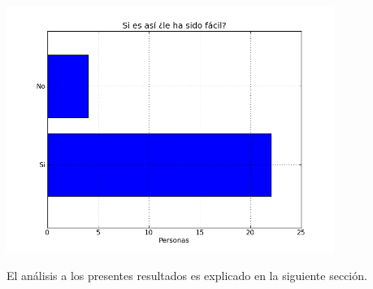 \begin{center}
	\includegraphics[width=0.8\textwidth]{images/fig15}
\end{center}

El análisis a los presentes resultados es explicado en la siguiente sección.
